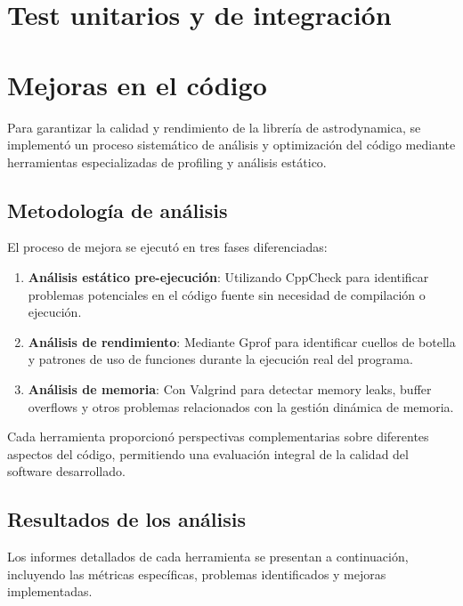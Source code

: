 \documentclass[12pt,a4paper]{article}
\begin{document}
\section{Test unitarios y de integración}
% 


\section{Mejoras en el código}

Para garantizar la calidad y rendimiento de la librería de astrodynamica, se implementó un proceso sistemático de análisis y optimización del código mediante herramientas especializadas de profiling y análisis estático.


\subsection{Metodología de análisis}

El proceso de mejora se ejecutó en tres fases diferenciadas:

\begin{enumerate}
\item \textbf{Análisis estático pre-ejecución}: Utilizando CppCheck para identificar problemas potenciales en el código fuente sin necesidad de compilación o ejecución.

\item \textbf{Análisis de rendimiento}: Mediante Gprof para identificar cuellos de botella y patrones de uso de funciones durante la ejecución real del programa.

\item \textbf{Análisis de memoria}: Con Valgrind para detectar memory leaks, buffer overflows y otros problemas relacionados con la gestión dinámica de memoria.
\end{enumerate}

Cada herramienta proporcionó perspectivas complementarias sobre diferentes aspectos del código, permitiendo una evaluación integral de la calidad del software desarrollado.

\subsection{Resultados de los análisis}

Los informes detallados de cada herramienta se presentan a continuación, incluyendo las métricas específicas, problemas identificados y mejoras implementadas.
\end{document}
